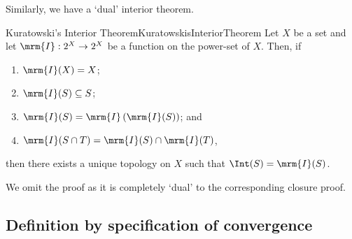 Similarly, we have a `dual' interior theorem.
\begin{thm}{Kuratowski's Interior Theorem}{KuratowskisInteriorTheorem}
Let $X$ be a set and let $\mrm{I}:2^X\rightarrow 2^X$ be a function on the power-set of $X$.  Then, if
\begin{enumerate}
\item $\mrm{I}(X)=X$;
\item $\mrm{I}(S)\subseteq S$;
\item $\mrm{I}(S)=\mrm{I}\left( \mrm{I}(S)\right)$; and
\item $\mrm{I}(S\cap T)=\mrm{I}(S)\cap \mrm{I}(T)$,
\end{enumerate}
then there exists a unique topology on $X$ such that $\Int (S)=\mrm{I}(S)$.
\begin{rmk}
We omit the proof as it is completely `dual' to the corresponding closure proof.
\end{rmk}
\end{thm}

\subsection{Definition by specification of convergence}

